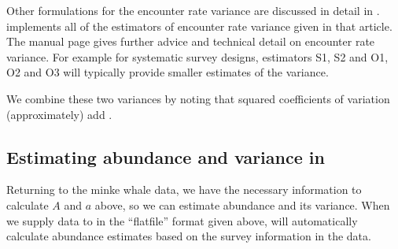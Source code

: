 \documentclass[article]{jss}
\begin{document}
Other formulations for the encounter rate variance are discussed in detail in \cite{Fewster:2009ku}.  implements all of the estimators of encounter rate variance given in that article. The  manual page gives further advice and technical detail on encounter rate variance. For example for systematic survey designs, estimators S1, S2 and O1, O2 and O3 will typically provide smaller estimates of the variance.

We combine these two variances by noting that squared coefficients of variation (approximately) add \citep[often referred to as ``the delta method'';][]{seber2002estimation}.


\subsection[Estimating abundance and variance in R]{Estimating abundance and variance in }

Returning to the minke whale data, we have the necessary information to calculate $A$ and $a$ above, so we can estimate abundance and its variance. When we supply data to  in the ``flatfile'' format given above,  will automatically calculate abundance estimates based on the survey information in the data.
\end{document}

